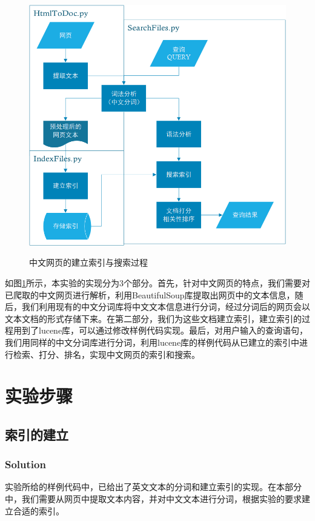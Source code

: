 \documentclass{article}
\begin{document}
\begin{figure}[htbp]
\centering
\includegraphics[width=12.5cm]{img/flowchart.png}
\label{fig:flowchart}
\caption{中文网页的建立索引与搜索过程}
\end{figure}

如图\ref{fig:flowchart}所示，本实验的实现分为3个部分。首先，针对中文网页的特点，我们需要对已爬取的中文网页进行解析，利用BeautifulSoup库提取出网页中的文本信息，随后，我们利用现有的中文分词库将中文文本信息进行分词，经过分词后的网页会以文本文档的形式存储下来。在第二部分，我们为这些文档建立索引，建立索引的过程用到了lucene库，可以通过修改样例代码实现。最后，对用户输入的查询语句，我们用同样的中文分词库进行分词，利用lucene库的样例代码从已建立的索引中进行检索、打分、排名，实现中文网页的索引和搜索。


\section{实验步骤}
\subsection{索引的建立}


\subsubsection{Solution}

实验所给的样例代码中，已给出了英文文本的分词和建立索引的实现。在本部分中，我们需要从网页中提取文本内容，并对中文文本进行分词，根据实验的要求建立合适的索引。
\end{document}
